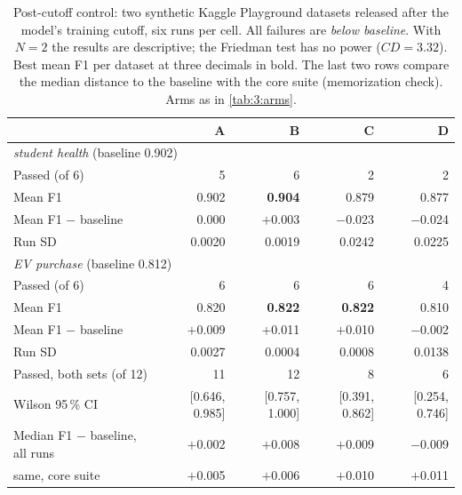 \begin{table}[htbp]
  \centering
  \small
  \caption[Post-cutoff control]{Post-cutoff control: two synthetic Kaggle Playground datasets released after the model's training cutoff, six runs per cell. All failures are \emph{below baseline}. With $N = 2$ the results are descriptive; the Friedman test has no power ($\mathit{CD} = 3.32$). Best mean F1 per dataset at three decimals in bold. The last two rows compare the median distance to the baseline with the core suite (memorization check). Arms as in \autoref{tab:3:arms}.}
  \label{tab:6:postcutoff}
  \begin{tabular}{lrrrr}
    \toprule
     & A & B & C & D \\
    \midrule
    \multicolumn{5}{l}{\emph{student health} (baseline 0.902)} \\
    \quad Passed (of 6) & 5 & 6 & 2 & 2 \\
    \quad Mean F1 & 0.902 & \textbf{0.904} & 0.879 & 0.877 \\
    \quad Mean F1 $-$ baseline & 0.000 & $+$0.003 & $-$0.023 & $-$0.024 \\
    \quad Run SD & 0.0020 & 0.0019 & 0.0242 & 0.0225 \\
    \midrule
    \multicolumn{5}{l}{\emph{EV purchase} (baseline 0.812)} \\
    \quad Passed (of 6) & 6 & 6 & 6 & 4 \\
    \quad Mean F1 & 0.820 & \textbf{0.822} & \textbf{0.822} & 0.810 \\
    \quad Mean F1 $-$ baseline & $+$0.009 & $+$0.011 & $+$0.010 & $-$0.002 \\
    \quad Run SD & 0.0027 & 0.0004 & 0.0008 & 0.0138 \\
    \midrule
    Passed, both sets (of 12) & 11 & 12 & 8 & 6 \\
    \quad Wilson 95\,\% CI & [0.646, 0.985] & [0.757, 1.000] & [0.391, 0.862] & [0.254, 0.746] \\
    Median F1 $-$ baseline, all runs & $+$0.002 & $+$0.008 & $+$0.009 & $-$0.009 \\
    \quad same, core suite & $+$0.005 & $+$0.006 & $+$0.010 & $+$0.011 \\
    \bottomrule
  \end{tabular}
\end{table}
